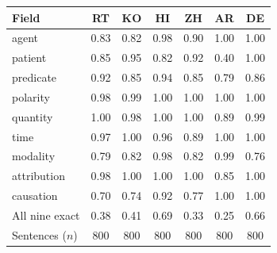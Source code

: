 \begin{tabular}{@{}lcccccc@{}}
\toprule
Field & RT & KO & HI & ZH & AR & DE \\
\midrule
agent & 0.83 & 0.82 & 0.98 & 0.90 & 1.00 & 1.00 \\
patient & 0.85 & 0.95 & 0.82 & 0.92 & 0.40 & 1.00 \\
predicate & 0.92 & 0.85 & 0.94 & 0.85 & 0.79 & 0.86 \\
polarity & 0.98 & 0.99 & 1.00 & 1.00 & 1.00 & 1.00 \\
quantity & 1.00 & 0.98 & 1.00 & 1.00 & 0.89 & 0.99 \\
time & 0.97 & 1.00 & 0.96 & 0.89 & 1.00 & 1.00 \\
modality & 0.79 & 0.82 & 0.98 & 0.82 & 0.99 & 0.76 \\
attribution & 0.98 & 1.00 & 1.00 & 1.00 & 0.85 & 1.00 \\
causation & 0.70 & 0.74 & 0.92 & 0.77 & 1.00 & 1.00 \\
\midrule
All nine exact & 0.38 & 0.41 & 0.69 & 0.33 & 0.25 & 0.66 \\
Sentences ($n$) & 800 & 800 & 800 & 800 & 800 & 800 \\
\bottomrule
\end{tabular}
